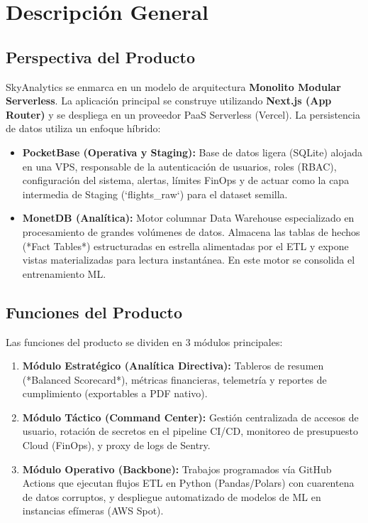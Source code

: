 \documentclass[11pt, letterpaper]{article}
\begin{document}

\section{Descripción General}

\subsection{Perspectiva del Producto}
SkyAnalytics se enmarca en un modelo de arquitectura \textbf{Monolito Modular Serverless}.
La aplicación principal se construye utilizando \textbf{Next.js (App Router)} y se despliega en un proveedor PaaS Serverless (Vercel). 
La persistencia de datos utiliza un enfoque híbrido:
\begin{itemize}
    \item \textbf{PocketBase (Operativa y Staging):} Base de datos ligera (SQLite) alojada en una VPS, responsable de la autenticación de usuarios, roles (RBAC), configuración del sistema, alertas, límites FinOps y de actuar como la capa intermedia de Staging (`flights_raw`) para el dataset semilla.
    \item \textbf{MonetDB (Analítica):} Motor columnar Data Warehouse especializado en procesamiento de grandes volúmenes de datos. Almacena las tablas de hechos (*Fact Tables*) estructuradas en estrella alimentadas por el ETL y expone vistas materializadas para lectura instantánea. En este motor se consolida el entrenamiento ML.
\end{itemize}

\subsection{Funciones del Producto}
Las funciones del producto se dividen en 3 módulos principales:
\begin{enumerate}
    \item \textbf{Módulo Estratégico (Analítica Directiva):} Tableros de resumen (*Balanced Scorecard*), métricas financieras, telemetría y reportes de cumplimiento (exportables a PDF nativo).
    \item \textbf{Módulo Táctico (Command Center):} Gestión centralizada de accesos de usuario, rotación de secretos en el pipeline CI/CD, monitoreo de presupuesto Cloud (FinOps), y proxy de logs de Sentry.
    \item \textbf{Módulo Operativo (Backbone):} Trabajos programados vía GitHub Actions que ejecutan flujos ETL en Python (Pandas/Polars) con cuarentena de datos corruptos, y despliegue automatizado de modelos de ML en instancias efímeras (AWS Spot).
\end{enumerate}
\end{document}
